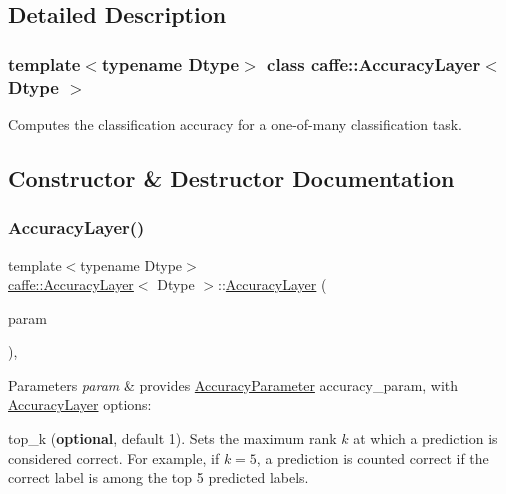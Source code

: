 \subsection{Detailed Description}
\subsubsection*{template$<$typename Dtype$>$\newline
class caffe\+::\+Accuracy\+Layer$<$ Dtype $>$}

Computes the classification accuracy for a one-\/of-\/many classification task. 

\subsection{Constructor \& Destructor Documentation}
\mbox{\label{classcaffe_1_1_accuracy_layer_a362ab61d1961c1b408f84a956f6e598d}} 
\subsubsection{\texorpdfstring{Accuracy\+Layer()}{AccuracyLayer()}\hspace{0.1cm}{\footnotesize\ttfamily [1/2]}}
{\footnotesize\ttfamily template$<$typename Dtype$>$ \\
\mbox{\hyperlink{classcaffe_1_1_accuracy_layer}{caffe\+::\+Accuracy\+Layer}}$<$ Dtype $>$\+::\mbox{\hyperlink{classcaffe_1_1_accuracy_layer}{Accuracy\+Layer}} (\begin{DoxyParamCaption}\item[{const \mbox{\hyperlink{classcaffe_1_1_layer_parameter}{Layer\+Parameter}} \&}]{param }\end{DoxyParamCaption})\hspace{0.3cm}{\ttfamily [inline]}, {\ttfamily [explicit]}}


\begin{DoxyParams}{Parameters}
{\em param} & provides \mbox{\hyperlink{classcaffe_1_1_accuracy_parameter}{Accuracy\+Parameter}} accuracy\+\_\+param, with \mbox{\hyperlink{classcaffe_1_1_accuracy_layer}{Accuracy\+Layer}} options\+:
\begin{DoxyItemize}
\item top\+\_\+k ({\bfseries optional}, default 1). Sets the maximum rank $ k $ at which a prediction is considered correct. For example, if $ k = 5 $, a prediction is counted correct if the correct label is among the top 5 predicted labels. 
\end{DoxyItemize}\\
\hline
\end{DoxyParams}
\mbox{\label{classcaffe_1_1_accuracy_layer_a362ab61d1961c1b408f84a956f6e598d}} 

